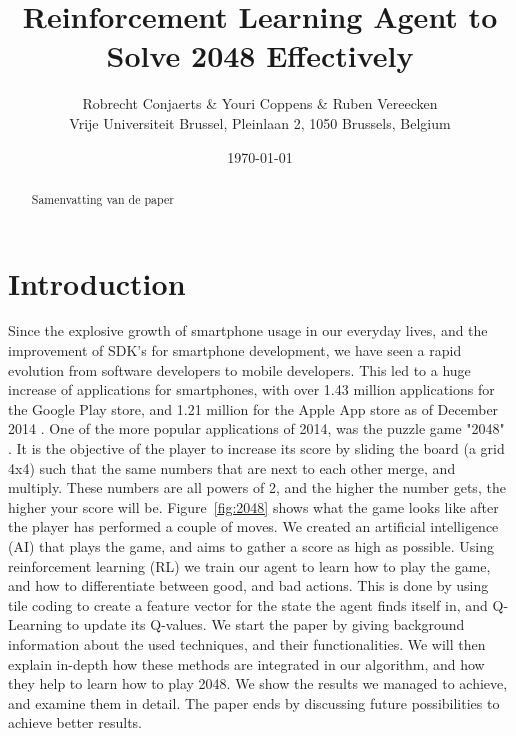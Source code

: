 \documentclass[a4paper,12pt]{article}
\begin{document}
\title{Reinforcement Learning Agent to Solve 2048 Effectively}
\author{
Robrecht Conjaerts \& Youri Coppens \& Ruben Vereecken \\
Vrije Universiteit Brussel, Pleinlaan 2, 1050 Brussels, Belgium \\
}
\date{\today}
\maketitle

\begin{abstract}
Samenvatting van de paper
\end{abstract}

\section{Introduction}
Since the explosive growth of smartphone usage in our everyday lives, and the improvement of SDK's for smartphone development, we have seen a rapid evolution from software developers to mobile developers. This led to a huge increase of applications for smartphones, with over 1.43 million applications for the Google Play store, and 1.21 million for the Apple App store as of December 2014 \cite{appstores}. One of the more popular applications of 2014, was the puzzle game "2048" \cite{2048}. It is the objective of the player to increase its score by sliding the board (a grid 4x4) such that the same numbers that are next to each other merge, and multiply. These numbers are all powers of 2, and the higher the number gets, the higher your score will be. Figure~\ref{fig:2048} shows what the game looks like after the player has performed a couple of moves. We created an artificial intelligence (AI) that plays the game, and aims to gather a score as high as possible. Using reinforcement learning (RL) \cite{sutton1998rl} we train our agent to learn how to play the game, and how to differentiate between good, and bad actions. This is done by using tile coding \cite{sutton1998rl} to create a feature vector for the state the agent finds itself in, and Q-Learning \cite{sutton1998rl} to update its Q-values. We start the paper by giving background information about the used techniques, and their functionalities. We will then explain in-depth how these methods are integrated in our algorithm, and how they help to learn how to play 2048. We show the results we managed to achieve, and examine them in detail. The paper ends by discussing future possibilities to achieve better results.
\end{document}
